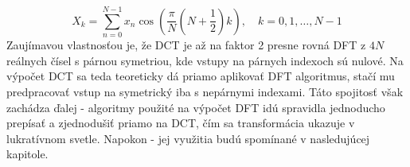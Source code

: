 \begin{equation}
    X_k = \sum_{n=0}^{N-1} x_n \cos (\frac{\pi}{N} (N + \frac{1}{2}) k),
    \quad k=0,1,\dots,N-1
    \label{eq:dct_transform}
\end{equation}
Zaujímavou vlastnosťou je, že DCT je až na faktor 2 presne rovná DFT z
$4N$ reálnych čísel s párnou symetriou, kde vstupy na párnych indexoch
sú nulové. Na výpočet DCT sa teda teoreticky dá priamo aplikovať DFT
algoritmus, stačí mu predpracovať vstup na symetrický iba s nepárnymi
indexami. Táto spojitosť však zachádza ďalej - algoritmy použité na
výpočet DFT idú spravidla jednoducho prepísať a zjednodušiť priamo na
DCT, čím sa transformácia ukazuje v lukratívnom svetle. Napokon - jej
využitia budú spomínané v nasledujúcej kapitole.

